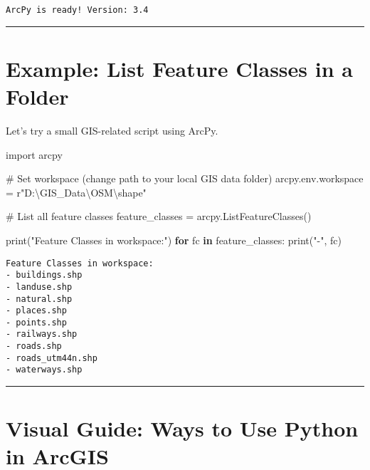 \documentclass[
  11pt,
  letterpaper,
]{book}
\newenvironment{Shaded}{\begin{snugshade}}{\end{snugshade}}
\newcommand{\BuiltInTok}[1]{\textcolor[rgb]{0.00,0.23,0.31}{#1}}
\newcommand{\CommentTok}[1]{\textcolor[rgb]{0.37,0.37,0.37}{#1}}
\newcommand{\ControlFlowTok}[1]{\textcolor[rgb]{0.00,0.23,0.31}{\textbf{#1}}}
\newcommand{\DecValTok}[1]{\textcolor[rgb]{0.68,0.00,0.00}{#1}}
\newcommand{\ErrorTok}[1]{\textcolor[rgb]{0.68,0.00,0.00}{#1}}
\newcommand{\ImportTok}[1]{\textcolor[rgb]{0.00,0.46,0.62}{#1}}
\newcommand{\KeywordTok}[1]{\textcolor[rgb]{0.00,0.23,0.31}{\textbf{#1}}}
\newcommand{\NormalTok}[1]{\textcolor[rgb]{0.00,0.23,0.31}{#1}}
\newcommand{\OperatorTok}[1]{\textcolor[rgb]{0.37,0.37,0.37}{#1}}
\newcommand{\StringTok}[1]{\textcolor[rgb]{0.13,0.47,0.30}{#1}}
\newcommand{\VerbatimStringTok}[1]{\textcolor[rgb]{0.13,0.47,0.30}{#1}}
\begin{document}
\begin{verbatim}
ArcPy is ready! Version: 3.4
\end{verbatim}

\begin{center}\rule{0.5\linewidth}{0.5pt}\end{center}

\section{Example: List Feature Classes in a
Folder}\label{example-list-feature-classes-in-a-folder}

Let's try a small GIS-related script using ArcPy.

\begin{Shaded}
\begin{Highlighting}[]
\ImportTok{import}\NormalTok{ arcpy}

\CommentTok{\# Set workspace (change path to your local GIS data folder)}
\NormalTok{arcpy.env.workspace }\OperatorTok{=} \VerbatimStringTok{r"D:}\DecValTok{\textbackslash{}G}\VerbatimStringTok{IS\_Data}\ErrorTok{\textbackslash{}}\VerbatimStringTok{OSM}\DecValTok{\textbackslash{}s}\VerbatimStringTok{hape"}

\CommentTok{\# List all feature classes}
\NormalTok{feature\_classes }\OperatorTok{=}\NormalTok{ arcpy.ListFeatureClasses()}

\BuiltInTok{print}\NormalTok{(}\StringTok{"Feature Classes in workspace:"}\NormalTok{)}
\ControlFlowTok{for}\NormalTok{ fc }\KeywordTok{in}\NormalTok{ feature\_classes:}
    \BuiltInTok{print}\NormalTok{(}\StringTok{"{-}"}\NormalTok{, fc)}
\end{Highlighting}
\end{Shaded}

\begin{verbatim}
Feature Classes in workspace:
- buildings.shp
- landuse.shp
- natural.shp
- places.shp
- points.shp
- railways.shp
- roads.shp
- roads_utm44n.shp
- waterways.shp
\end{verbatim}

\begin{center}\rule{0.5\linewidth}{0.5pt}\end{center}

\section{Visual Guide: Ways to Use Python in
ArcGIS}\label{visual-guide-ways-to-use-python-in-arcgis}
\end{document}
